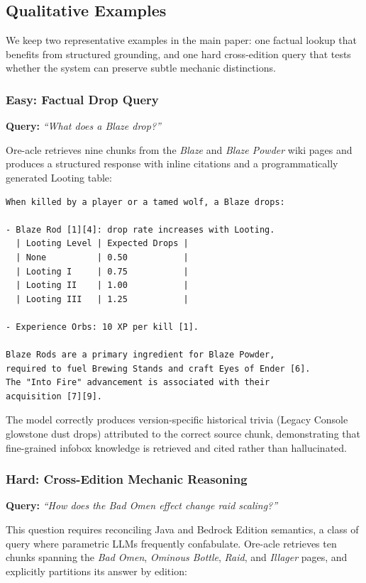 \documentclass[11pt,a4paper]{article}
\begin{document}
\subsection{Qualitative Examples}
\label{sec:qualitative}

We keep two representative examples in the main paper: one factual lookup that benefits from structured grounding, and one hard cross-edition query that tests whether the system can preserve subtle mechanic distinctions.

\subsubsection*{Easy: Factual Drop Query}

\textbf{Query:} \textit{``What does a Blaze drop?''}

Ore-acle retrieves nine chunks from the \textit{Blaze} and \textit{Blaze Powder} wiki pages and produces a structured response with inline citations and a programmatically generated Looting table:

\begin{lstlisting}
When killed by a player or a tamed wolf, a Blaze drops:

- Blaze Rod [1][4]: drop rate increases with Looting.
  | Looting Level | Expected Drops |
  | None          | 0.50           |
  | Looting I     | 0.75           |
  | Looting II    | 1.00           |
  | Looting III   | 1.25           |

- Experience Orbs: 10 XP per kill [1].

Blaze Rods are a primary ingredient for Blaze Powder,
required to fuel Brewing Stands and craft Eyes of Ender [6].
The "Into Fire" advancement is associated with their
acquisition [7][9].
\end{lstlisting}

\noindent The model correctly produces version-specific historical trivia (Legacy Console glowstone dust drops) attributed to the correct source chunk, demonstrating that fine-grained infobox knowledge is retrieved and cited rather than hallucinated.

\subsubsection*{Hard: Cross-Edition Mechanic Reasoning}

\textbf{Query:} \textit{``How does the Bad Omen effect change raid scaling?''}

This question requires reconciling Java and Bedrock Edition semantics, a class of query where parametric LLMs frequently confabulate. Ore-acle retrieves ten chunks spanning the \textit{Bad Omen}, \textit{Ominous Bottle}, \textit{Raid}, and \textit{Illager} pages, and explicitly partitions its answer by edition:
\end{document}
